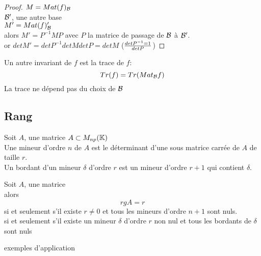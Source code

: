 \documentclass[../main.tex]{subfile}
\begin{document}
\begin{proof}
	$M = Mat (f)_{\mathcal{B}}$\\
	$\mathcal{B}'$, une autre base\\
	$M' = Mat(f)_{\mathcal{B}}'$\\
	alors $M'=P^{-1}MP$ avec $P$ la matrice de passage de $\mathcal{B}$ à $\mathcal{B}'$.\\
	or $detM' = det P^{-1} det M det P = det M$ ($det P^{-1} = 1 \over det P$)
\end{proof}

\begin{rema}
	Un autre invariant de $f$ est la trace de $f$:
	$$Tr(f) = Tr(Mat_{\mathcal{B}} f)$$
	La trace ne dépend pas du choix de $\mathcal{B}$
\end{rema}


\subsection{Rang}
\begin{defi}
	Soit $A$, une matrice $A \subset M_{np}(\mathbb{K})$\\
	Une mineur d'ordre $n$ de $A$ est le déterminant d'une sous matrice carrée de $A$ de taille $r$.\\
	Un bordant d'un mineur $\delta$ d'ordre $r$ est un mineur d'ordre $r+1$ qui contient $\delta$. 
\end{defi}

\begin{ex}
\end{ex}

\begin{theo}
	Soit $A$, une matrice\\
	alors 
	$$rg A = r $$ si et seulement s'il existe $r \neq 0$ et tous les mineurs d'ordre $n+1$ sont nuls.\\
	si et seulement s'il existe un mineur $\delta$ d'ordre $r$ non nul et tous les bordants de $\delta$ sont nuls
\end{theo}

exemples d'application
\end{document}
